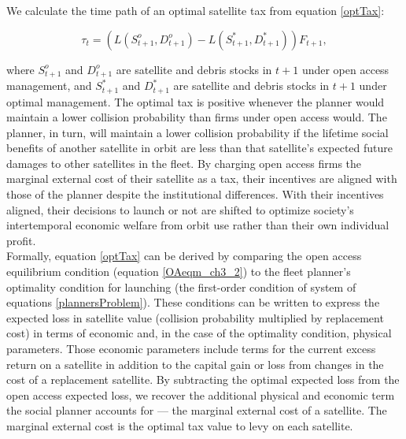 \documentclass[12pt]{article}
\begin{document}
We calculate the time path of an optimal satellite tax from equation \ref{optTax}:

\begin{equation}
\label{optTax}
\tau_t = (L(S^o_{t+1},D^o_{t+1}) - L(S^*_{t+1},D^*_{t+1}))F_{t+1},
\end{equation}

where $S^o_{t+1}$ and $D^o_{t+1}$ are satellite and debris stocks in $t+1$ under open access management, and $S^*_{t+1}$ and $D^*_{t+1}$ are satellite and debris stocks in $t+1$ under optimal management. The optimal tax is positive whenever the planner would maintain a lower collision probability than firms under open access would. The planner, in turn, will maintain a lower collision probability if the lifetime social benefits of another satellite in orbit are less than that satellite's expected future damages to other satellites in the fleet. By charging open access firms the marginal external cost of their satellite as a tax, their incentives are aligned with those of the planner despite the institutional differences. With their incentives aligned, their decisions to launch or not are shifted to optimize society's intertemporal economic welfare from orbit use rather than their own individual profit. \\

Formally, equation \ref{optTax} can be derived by comparing the open access equilibrium condition (equation \ref{OAeqm_ch3_2}) to the fleet planner's optimality condition for launching (the first-order condition of system of equations \ref{plannersProblem}). These conditions can be written to express the expected loss in satellite value (collision probability multiplied by replacement cost) in terms of economic and, in the case of the optimality condition, physical parameters. Those economic parameters include terms for the current excess return on a satellite in addition to the capital gain or loss from changes in the cost of a replacement satellite. By subtracting the optimal expected loss from the open access expected loss, we recover the additional physical and economic term the social planner accounts for --- the marginal external cost of a satellite. The marginal external cost is the optimal tax value to levy on each satellite. \\
\end{document}
